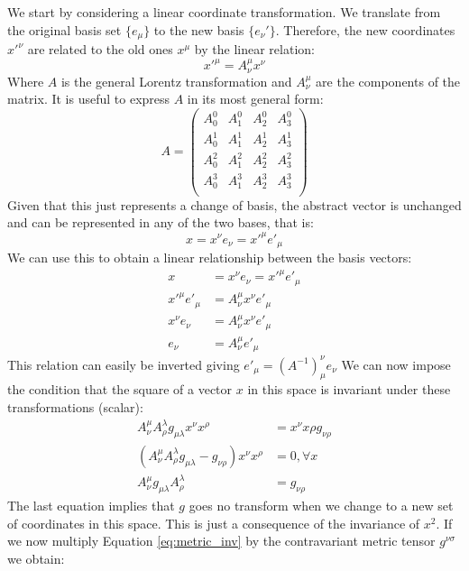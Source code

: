\vspace{2mm}\noindent We start by considering a linear coordinate transformation. We translate from the original basis set $\{e_\mu\}$ to the new basis $\{e_\nu'\}$.  Therefore, the new coordinates $x'^\nu$ are related to the old ones $x^\mu$ by the linear relation:
\begin{equation}
    x'^\mu = A^\mu_\nu x^\nu
\end{equation}
Where $A$ is the general Lorentz transformation and $A^\mu_\nu$ are the components of the matrix. It is useful to express $A$ in its most general form:
\begin{equation}
    A =  \begin{pmatrix}A^0_0 & A^0_1 & A^0_2 & A^0_3\\
A^1_0 & A^1_1 & A^1_2 & A^1_3\\
A^2_0 & A^2_1 & A^2_2 & A^2_3\\
A^3_0 & A^3_1 & A^3_2 & A^3_3\\
\end{pmatrix}
\end{equation}
Given that this just represents a change of basis, the abstract vector is unchanged and can be represented in any of the two bases, that is:
\begin{equation}
    x = x^\nu e_\nu = x'^\mu e'_\mu
\end{equation}
We can use this to obtain a linear relationship between the basis vectors:
\begin{align}
    x &=  x^\nu e_\nu = x'^\mu e'_\mu\\
     x'^\mu e'_\mu &=  A^\mu_\nu x^\nu  e'_\mu \\ 
    x^\nu e_\nu &=  A^\mu_\nu x^\nu  e'_\mu\\
     e_\nu &=  A^\mu_\nu e'_\mu
\end{align}
This relation can easily be inverted giving $ e'_\mu=  (A^{-1})^\nu_\mu   e_\nu $ We can now impose the condition that the square of a vector $x$ in this space is invariant under these transformations (scalar):
\begin{align}
    A^\mu_\nu A^\lambda_\rho g_{\mu\lambda}x^\nu x^\rho &= x^\nu x\rho g_{\nu\rho}\\
    ( A^\mu_\nu A^\lambda_\rho g_{\mu\lambda}- g_{\nu\rho}) x^\nu x^\rho &= 0, \forall x \\
      A^\mu_\nu g_{\mu\lambda}  A^\lambda_\rho &= g_{\nu\rho}
      \label{eq:metric_inv}
\end{align}
The last equation implies that $g$ goes no transform when we change to a new set of coordinates in this space. This is just a consequence of the invariance of $x^2$. If we now multiply Equation \ref{eq:metric_inv} by the contravariant metric tensor $g^{\nu\sigma}$ we obtain:
